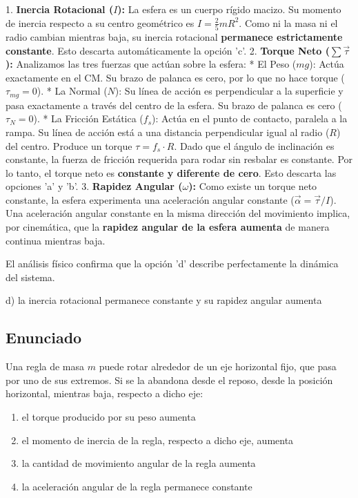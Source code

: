 \documentclass[12pt, a4paper]{article}
\begin{document}
1. \textbf{Inercia Rotacional ($I$):} La esfera es un cuerpo rígido macizo. Su momento de inercia respecto a su centro geométrico es $I = \frac{2}{5}mR^2$. Como ni la masa ni el radio cambian mientras baja, su inercia rotacional \textbf{permanece estrictamente constante}. Esto descarta automáticamente la opción 'c'.
2. \textbf{Torque Neto ($\sum \vec{\tau}$):} Analizamos las tres fuerzas que actúan sobre la esfera:
    * El Peso ($mg$): Actúa exactamente en el CM. Su brazo de palanca es cero, por lo que no hace torque ($\tau_{mg} = 0$).
    * La Normal ($N$): Su línea de acción es perpendicular a la superficie y pasa exactamente a través del centro de la esfera. Su brazo de palanca es cero ($\tau_N = 0$).
    * La Fricción Estática ($f_s$): Actúa en el punto de contacto, paralela a la rampa. Su línea de acción está a una distancia perpendicular igual al radio ($R$) del centro. Produce un torque $\tau = f_s \cdot R$.
    Dado que el ángulo de inclinación es constante, la fuerza de fricción requerida para rodar sin resbalar es constante. Por lo tanto, el torque neto es \textbf{constante y diferente de cero}. Esto descarta las opciones 'a' y 'b'.
3. \textbf{Rapidez Angular ($\omega$):} Como existe un torque neto constante, la esfera experimenta una aceleración angular constante ($\vec{\alpha} = \vec{\tau}/I$). Una aceleración angular constante en la misma dirección del movimiento implica, por cinemática, que la \textbf{rapidez angular de la esfera aumenta} de manera continua mientras baja.

El análisis físico confirma que la opción 'd' describe perfectamente la dinámica del sistema.

\begin{tcolorbox}[colback=green!5!white, colframe=green!50!black, title=Respuesta Final]
\centering \Large d) la inercia rotacional permanece constante y su rapidez angular aumenta
\end{tcolorbox}

\newpage

\subsection*{Enunciado}
Una regla de masa $m$ puede rotar alrededor de un eje horizontal fijo, que pasa por uno de sus extremos. Si se la abandona desde el reposo, desde la posición horizontal, mientras baja, respecto a dicho eje:
\begin{enumerate}[label=\alph*.]
    \item el torque producido por su peso aumenta
    \item el momento de inercia de la regla, respecto a dicho eje, aumenta
    \item la cantidad de movimiento angular de la regla aumenta
    \item la aceleración angular de la regla permanece constante
\end{enumerate}
\end{document}
